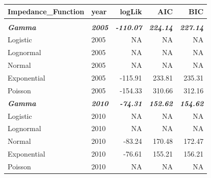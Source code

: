 \documentclass[
11pt, %
oneside, %
english, %
singlespacing, %
]{macthesis} %
\begin{document}
\begin{table}
\centering\begingroup\fontsize{9}{11}\selectfont

\begin{tabular}{llrrr}
\toprule
Impedance\_Function & year & logLik & AIC & BIC\\
\midrule
\addlinespace[0.3em]
\multicolumn{5}{l}{\textbf{Destination: Outdoors }}\\
\begingroup\fontsize{9}{11}\selectfont \em{\textbf{\hspace{1em}Gamma}}\endgroup & \begingroup\fontsize{9}{11}\selectfont \em{\textbf{2005}}\endgroup & \begingroup\fontsize{9}{11}\selectfont \em{\textbf{-110.07}}\endgroup & \begingroup\fontsize{9}{11}\selectfont \em{\textbf{224.14}}\endgroup & \begingroup\fontsize{9}{11}\selectfont \em{\textbf{227.14}}\endgroup\\
\hspace{1em}Logistic & 2005 & NA & NA & NA\\
\hspace{1em}Lognormal & 2005 & NA & NA & NA\\
\hspace{1em}Normal & 2005 & NA & NA & NA\\
\hspace{1em}Exponential & 2005 & -115.91 & 233.81 & 235.31\\
\hspace{1em}Poisson & 2005 & -154.33 & 310.66 & 312.16\\
\begingroup\fontsize{9}{11}\selectfont \em{\textbf{\hspace{1em}Gamma}}\endgroup & \begingroup\fontsize{9}{11}\selectfont \em{\textbf{2010}}\endgroup & \begingroup\fontsize{9}{11}\selectfont \em{\textbf{-74.31}}\endgroup & \begingroup\fontsize{9}{11}\selectfont \em{\textbf{152.62}}\endgroup & \begingroup\fontsize{9}{11}\selectfont \em{\textbf{154.62}}\endgroup\\
\hspace{1em}Logistic & 2010 & NA & NA & NA\\
\hspace{1em}Lognormal & 2010 & NA & NA & NA\\
\hspace{1em}Normal & 2010 & -83.24 & 170.48 & 172.47\\
\hspace{1em}Exponential & 2010 & -76.61 & 155.21 & 156.21\\
\hspace{1em}Poisson & 2010 & NA & NA & NA\\

\end{tabular}
\end{table}
\end{document}

